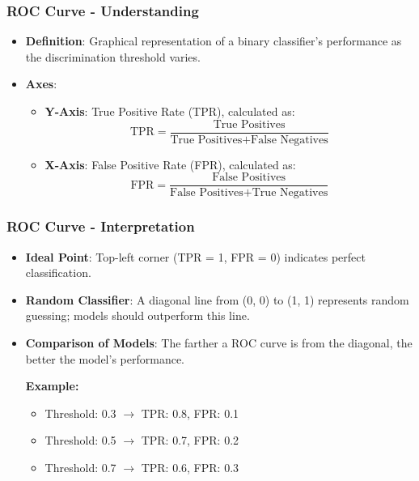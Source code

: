 \documentclass{beamer}
\begin{document}
\begin{frame}[fragile]
    \frametitle{ROC Curve - Understanding}
    \begin{itemize}
        \item \textbf{Definition}: Graphical representation of a binary classifier's performance as the discrimination threshold varies.
        \item \textbf{Axes}:
        \begin{itemize}
            \item \textbf{Y-Axis}: True Positive Rate (TPR), calculated as:
            \begin{equation}
                \text{TPR} = \frac{\text{True Positives}}{\text{True Positives} + \text{False Negatives}}
            \end{equation}
            \item \textbf{X-Axis}: False Positive Rate (FPR), calculated as:
            \begin{equation}
                \text{FPR} = \frac{\text{False Positives}}{\text{False Positives} + \text{True Negatives}}
            \end{equation}
        \end{itemize}
    \end{itemize}
\end{frame}

\begin{frame}[fragile]
    \frametitle{ROC Curve - Interpretation}
    \begin{itemize}
        \item \textbf{Ideal Point}: Top-left corner (TPR = 1, FPR = 0) indicates perfect classification.
        \item \textbf{Random Classifier}: A diagonal line from (0, 0) to (1, 1) represents random guessing; models should outperform this line.
        \item \textbf{Comparison of Models}: The farther a ROC curve is from the diagonal, the better the model's performance.
        
        \medskip
        \textbf{Example:}
        \begin{itemize}
            \item Threshold: 0.3 $\rightarrow$ TPR: 0.8, FPR: 0.1
            \item Threshold: 0.5 $\rightarrow$ TPR: 0.7, FPR: 0.2
            \item Threshold: 0.7 $\rightarrow$ TPR: 0.6, FPR: 0.3
        \end{itemize}
    \end{itemize}
\end{frame}
\end{document}
